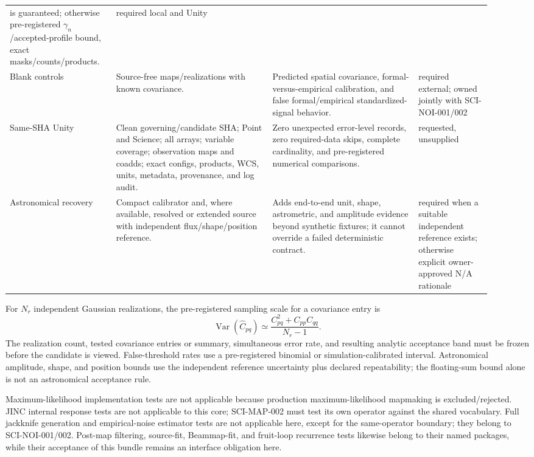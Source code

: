 \documentclass[11pt]{article}
\newcommand{\Var}{\operatorname{Var}}
\begin{document}
\begin{longtable}{L{0.20\linewidth}L{0.30\linewidth}L{0.28\linewidth}L{0.14\linewidth}}
is guaranteed; otherwise
pre-registered \(\gamma_n\)/accepted-profile bound, exact masks/counts/products.
& required local and Unity\\
Blank controls & Source-free maps/realizations with known covariance. &
Predicted spatial covariance, formal-versus-empirical calibration, and false
formal/empirical standardized-signal behavior. & required external; owned
jointly with SCI-NOI-001/002\\
Same-SHA Unity & Clean governing/candidate SHA; Point and Science; all arrays;
variable coverage; observation maps and coadds; exact configs, products, WCS,
units, metadata, provenance, and log audit. & Zero unexpected error-level records,
zero required-data skips, complete cardinality, and pre-registered numerical
comparisons. & requested, unsupplied\\
Astronomical recovery & Compact calibrator and, where available, resolved or
extended source with independent flux/shape/position reference. & Adds
end-to-end unit, shape, astrometric, and amplitude evidence beyond synthetic
fixtures; it cannot override a failed deterministic contract. & required when
a suitable independent reference exists; otherwise explicit owner-approved
N/A rationale\\
\bottomrule
\end{longtable}

For \(N_r\) independent Gaussian realizations, the pre-registered sampling
scale for a covariance entry is
\begin{equation}
 \Var(\widehat C_{pq})\simeq
 \frac{C_{pq}^2+C_{pp}C_{qq}}{N_r-1}.
 \label{eq:empirical-covariance-sampling}
\end{equation}
The realization count, tested covariance entries or summary, simultaneous
error rate, and resulting analytic acceptance band must be frozen before the
candidate is viewed. False-threshold rates use a pre-registered binomial or
simulation-calibrated interval. Astronomical amplitude, shape, and position
bounds use the independent reference uncertainty plus declared repeatability;
the floating-sum bound alone is not an astronomical acceptance rule.

Maximum-likelihood implementation tests are not applicable because production
maximum-likelihood mapmaking is excluded/rejected. JINC internal response tests
are not applicable to this core; SCI-MAP-002 must test its own operator against
the shared vocabulary. Full jackknife generation and empirical-noise estimator
tests are not applicable here, except for the same-operator boundary; they
belong to SCI-NOI-001/002. Post-map filtering, source-fit, Beammap-fit, and
fruit-loop recurrence tests likewise belong to their named packages, while
their acceptance of this bundle remains an interface obligation here.
\end{document}
